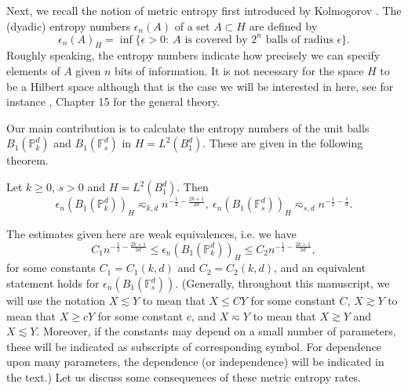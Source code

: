 Next, we recall the notion of metric entropy first introduced by Kolmogorov \cite{kolmogorov1958linear}. The (dyadic) entropy numbers $\epsilon_n(A)$ of a set $A\subset H$ are defined by
\begin{equation}
 \epsilon_n(A)_H = \inf\{\epsilon > 0:~\text{$A$ is covered by $2^n$ balls of radius $\epsilon$}\}.
\end{equation}
Roughly speaking, the entropy numbers indicate how precisely we can specify elements of $A$ given $n$ bits of information.
It is not necessary for the space $H$ to be a Hilbert space although that is the case we will be interested in here, see for instance \cite{lorentz1996constructive}, Chapter 15 for the general theory.

Our main contribution is to calculate the entropy numbers of the unit balls $B_1(\mathbb{P}_k^d)$ and $B_1(\mathbb{F}_s^d)$ in $H = L^2(B_1^d)$. These are given in the following theorem.
\begin{theorem}
Let $k \geq 0$, $s > 0$ and $H = L^2(B_1^d)$. Then
\begin{equation}\label{metric-entropy-rates}
 \epsilon_n(B_1(\mathbb{P}_k^d))_H \eqsim_{k,d} n^{-\frac{1}{2} - \frac{2k+1}{2d}},~\epsilon_n(B_1(\mathbb{F}_s^d))_H \eqsim_{s,d} n^{-\frac{1}{2} - \frac{s}{d}}.
\end{equation}
\end{theorem}
The estimates given here are weak equivalences, i.e. we have
\begin{equation}
 C_1n^{-\frac{1}{2} - \frac{2k+1}{2d}} \leq \epsilon_n(B_1(\mathbb{P}_k^d))_H \leq C_2n^{-\frac{1}{2} - \frac{2k+1}{2d}},
\end{equation}
for some constants $C_1 = C_1(k,d)$ and $C_2 = C_2(k,d)$, and an equivalent statement holds for $\epsilon_n(B_1(\mathbb{F}_s^d))$. (Generally, throughout this manuscript, we will use the notation $X\lesssim Y$ to mean that $X\leq CY$ for some constant $C$, $X\gtrsim Y$ to mean that $X \geq cY$ for some constant $c$, and $X\eqsim Y$ to mean that $X\gtrsim Y$ and $X\lesssim Y$. Moreover, if the constants may depend on a small number of parameters, these will be indicated as subscripts of corresponding symbol. For dependence upon many parameters, the dependence (or independence) will be indicated in the text.) Let us discuss some consequences of these metric entropy rates.

